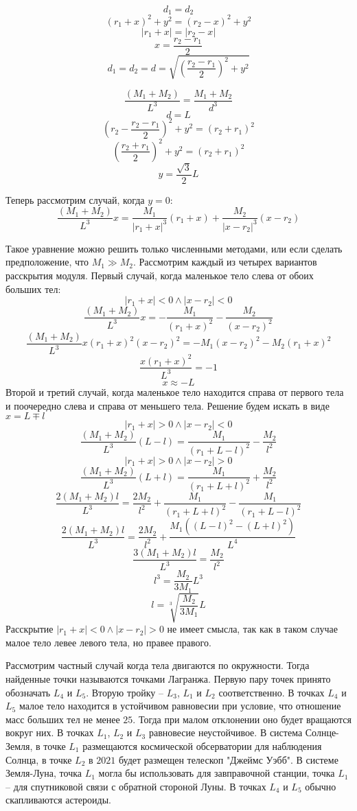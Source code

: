 \documentclass{article}
\begin{document}
    \[ d_1 = d_2 \]
    \[ (r_1 + x)^2 + y^2 = (r_2 - x)^2 + y^2\]
    \[ |r_1 + x| = |r_2 - x| \]
    \[ x = \frac{r_2 - r_1}{2} \]
    \[ d_1 = d_2 = d = \sqrt{ \left(\frac{r_2 - r_1}{2}\right)^2 + y^2} \]

    \[ \frac{\left( M_1 + M_2 \right) }{L^3} = \frac{M_1 + M_2}{d^3} \]
    \[ d = L \]
    \[ \left(r_2 - \frac{r_2 - r_1}{2}\right)^2 + y^2 = \left( r_2 + r_1 \right)^2 \]
    \[ \left(\frac{r_2 + r_1}{2}\right)^2 + y^2 = \left( r_2 + r_1 \right)^2 \]
    \[ y = \frac{\sqrt{3}}{2}L \]
    
    Теперь рассмотрим случай, когда $y = 0$:
    \[ \frac{\left( M_1 + M_2 \right) }{L^3} x =
       \frac{M_1}{|r_1 + x|^3} (r_1 + x) + \frac{M_2}{|x - r_2|^3} (x - r_2) \]

    Такое уравнение можно решить только численными методами, или если сделать предположение, что $M_1 \gg M_2$.
    Рассмотрим каждый из четырех вариантов расскрытия модуля.
    Первый случай, когда маленькое тело слева от обоих больших тел:
    \[ |r_1 + x| < 0 \land |x - r_2| < 0 \]
    \[ \frac{\left( M_1 + M_2 \right) }{L^3} x =
       -\frac{M_1}{(r_1 + x)^2} - \frac{M_2}{(x - r_2)^2} \]
    \[ \frac{\left( M_1 + M_2 \right) }{L^3} x (r_1 + x)^2 (x - r_2)^2 =
       - M_1 (x - r_2)^2 - M_2 (r_1 + x)^2 \]
    \[ \frac{x(r_1 + x)^2}{L^3} = -1 \]
    \[ x \approx -L \]
    Второй и третий случай, когда маленькое тело находится справа от первого тела и поочередно слева и справа от меньшего тела. Решение будем искать в виде $x = L \mp l$
    \[ |r_1 + x| > 0 \land |x - r_2| < 0 \]
    \[ \frac{\left( M_1 + M_2 \right) }{L^3} (L - l) =
       \frac{M_1}{(r_1 + L - l)^2} - \frac{M_2}{l^2} \]
    \[ |r_1 + x| > 0 \land |x - r_2| > 0 \]
    \[ \frac{\left( M_1 + M_2 \right) }{L^3} (L + l) =
       \frac{M_1}{(r_1 + L + l)^2} + \frac{M_2}{l^2} \]
    \[ \frac{2 \left( M_1 + M_2 \right) l}{L^3} = \frac{2M_2}{l^2} + \frac{M_1}{(r_1 + L + l)^2} - \frac{M_1}{(r_1 + L - l)^2} \]
    \[ \frac{2 \left( M_1 + M_2 \right) l}{L^3} = \frac{2M_2}{l^2} + \frac{M_1\left((L - l)^2 - (L + l)^2\right)}{L^4} \]
    \[ \frac{3 \left( M_1 + M_2 \right) l}{L^3} = \frac{M_2}{l^2} \]
    \[ l^3 = \frac{M_2}{3 M_1} L^3 \]
    \[ l = \sqrt[3]{\frac{M_2}{3 M_1}} L \]
    Расскрытие $|r_1 + x| < 0 \land |x - r_2| > 0$ не имеет смысла, так как в таком случае малое тело левее левого тела, но правее правого.
    
    Рассмотрим частный случай когда тела двигаются по окружности.
    Тогда найденные точки называются точками Лагранжа.
    Первую пару точек принято обозначать $L_4$ и $L_5$. Вторую тройку -- $L_3$, $L_1$ и $L_2$ соответственно.
    В точках $L_4$ и $L_5$ малое тело находится в устойчивом равновесии при условие, что отношение масс больших тел не менее $25$.
    Тогда при малом отклонении оно будет вращаются вокруг них. В точках $L_1$, $L_2$ и $L_3$ равновесие неустойчивое.
    В система Солнце-Земля, в точке $L_1$ размещаются космической обсерватории для наблюдения Солнца, в точке $L_2$ в $2021$ будет размещен телескоп "Джеймс Уэбб".
    В системе Земля-Луна, точка $L_1$ могла бы использовать для завправочной станции, точка $L_1$ -- для спутниковой связи с обратной стороной Луны.
    В точках $L_4$ и $L_5$ обычно скапливаются астероиды.
    
\end{document}
